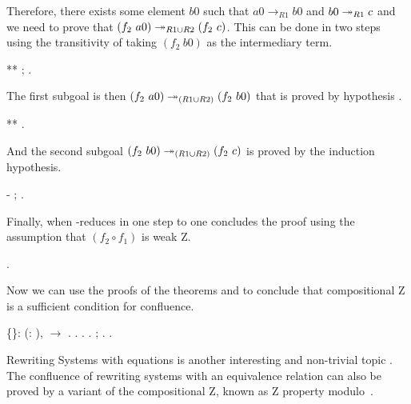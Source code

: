       Therefore, there exists some element $b0$ such that $a0\to_{R1}
      b0$ and $b0 \twoheadrightarrow_{R1} c$ and we need to prove that $(f_2\ a0)
      \twoheadrightarrow_{R1\cup R2} (f_2\ c)$. This can be done in two steps using
      the transitivity of  taking $(f_2\ b0)$ as the
      intermediary term. \begin{coqdoccode}
\coqdocemptyline
\coqdocindent{4.00em}
**  ; . \end{coqdoccode}
The first subgoal is then $(f_2\
           a0)\twoheadrightarrow_{(R1 \cup R2)} (f_2\ b0)$ that is proved by
           hypothesis . \begin{coqdoccode}
\coqdocemptyline
\coqdocindent{4.00em}
** . \end{coqdoccode}
And the second subgoal $(f_2\ b0) \twoheadrightarrow_{(R1
           \cup R2)} (f_2\ c)$ is proved by the induction
           hypothesis. \begin{coqdoccode}
\coqdocemptyline
\coqdocindent{1.00em}
-  ; . \end{coqdoccode}
Finally, when \coqdocvar{a} \coqdocvar{R2}-reduces in one
    step to  one concludes the proof using the assumption that
    $(f_2 \circ f_1)$ is weak Z. \begin{coqdoccode}
\coqdocnoindent
{}.\coqdoceol
\coqdocemptyline
\end{coqdoccode}
Now we can use the proofs of the theorems 
and \coqdocvar{Z\_prop\_implies\_Confl} to conclude that compositional Z is a
sufficient condition for confluence. \begin{coqdoccode}
\coqdocemptyline
\coqdocnoindent
{}  \{\}: \coqdockw{\ensuremath{\forall}} (:  ),   \ensuremath{\rightarrow}  .\coqdoceol
\coqdocnoindent
{}.\coqdoceol
\coqdocindent{1.00em}
  .\coqdoceol
\coqdocindent{1.00em}
   .\coqdoceol
\coqdocindent{1.00em}
 ; .\coqdoceol
\coqdocnoindent
{}.\coqdoceol
\coqdocemptyline
\end{coqdoccode}
Rewriting Systems with equations is another interesting and
    non-trivial topic \cite{winkler89,terese03}. The confluence of
    rewriting systems with an equivalence relation can also be proved
    by a variant of the compositional Z, known as Z property
    modulo~\cite{AK12b}.


